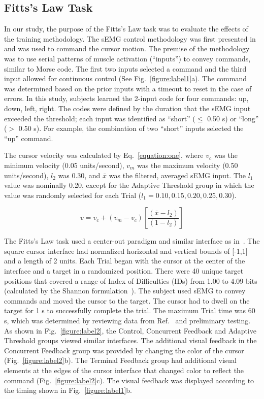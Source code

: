 \subsection{Fitts's Law Task}
In our study, the purpose of the Fitts's Law task was to evaluate the effects of the training methodology.
The sEMG control methodology was first presented in~\cite{RN45} and was used to command the cursor motion.
The premise of the methodology was to use serial patterns of muscle activation (``inputs'') to convey commands, similar to Morse code.
The first two inputs selected a command and the third input allowed for continuous control (See Fig.~\ref{figure:label1}a).
The command was determined based on the prior inputs with a timeout to reset in the case of errors.
In this study, subjects learned the 2-input code for four commands: up, down, left, right.
The codes were defined by the duration that the sEMG input exceeded the threshold; each input was identified as ``short'' ($\leq$ 0.50 s) or ``long'' ($>$ 0.50 s).
For example, the combination of two ``short'' inputs selected the ``up'' command.

The cursor velocity was calculated by Eq.~\ref{equation:one}, where $v_c$ was the minimum velocity (0.05 units/second), $v_m$ was the maximum velocity (0.50 units/second), $l_2$ was 0.30, and $\bar{x}$ was the filtered, averaged sEMG input.
The $l_1$ value was nominally 0.20, except for the Adaptive Threshold group in which the value was randomly selected for each Trial ($l_1 = 0.10, 0.15, 0.20, 0.25, 0.30$).

\begin{equation}
\label{equation:one}
v= v_c+\left(v_m-v_c\right)\left[\frac{\left(\bar{x}-l_2\right)}{\left(1-l_2\right)}\right]
\end{equation}

The Fitts's Law task used a center-out paradigm and similar interface as in~\cite{RN45}.
The square cursor interface had normalized horizontal and vertical bounds of [-1,1] and a length of 2 units.
Each Trial began with the cursor at the center of the interface and a target in a randomized position.
There were 40 unique target positions that covered a range of Index of Difficulties (IDs) from 1.00 to 4.09 bits (calculated by the Shannon formulation~\cite{RN50}).
The subject used sEMG to convey commands and moved the cursor to the target.
The cursor had to dwell on the target for 1 s to successfully complete the trial.
The maximum Trial time was 60 s, which was determined by reviewing data from Ref.~\cite{RN45} and preliminary testing.
As shown in Fig.~\ref{figure:label2}, the Control, Concurrent Feedback and Adaptive Threshold groups viewed similar interfaces.
The additional visual feedback in the Concurrent Feedback group was provided by changing the color of the cursor (Fig.~\ref{figure:label2}b).
The Terminal Feedback group had additional visual elements at the edges of the cursor interface that changed color to reflect the command (Fig.~\ref{figure:label2}c).
The visual feedback was displayed according to the timing shown in Fig.~\ref{figure:label1}b.

